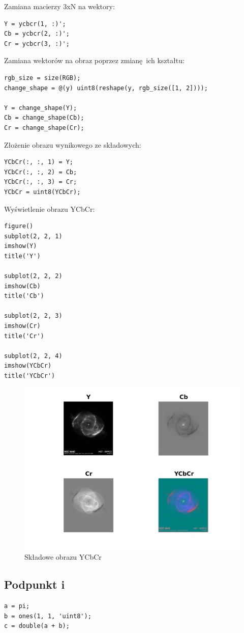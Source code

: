 \documentclass[a4paper, 12pt, titlepage]{article}
\begin{document}
       Zamiana macierzy 3xN na wektory:
\begin{lstlisting}
Y = ycbcr(1, :)';
Cb = ycbcr(2, :)';
Cr = ycbcr(3, :)';
\end{lstlisting}
       Zamiana wektorów na obraz poprzez zmianę ich kształtu:
\begin{lstlisting}
rgb_size = size(RGB);
change_shape = @(y) uint8(reshape(y, rgb_size([1, 2])));

Y = change_shape(Y);
Cb = change_shape(Cb);
Cr = change_shape(Cr);

\end{lstlisting}
       Złożenie obrazu wynikowego ze składowych:
\begin{lstlisting}
YCbCr(:, :, 1) = Y;
YCbCr(:, :, 2) = Cb;
YCbCr(:, :, 3) = Cr;
YCbCr = uint8(YCbCr);
\end{lstlisting}
        Wyświetlenie obrazu YCbCr:
\begin{lstlisting}
figure()
subplot(2, 2, 1)
imshow(Y)
title('Y')

subplot(2, 2, 2)
imshow(Cb)
title('Cb')

subplot(2, 2, 3)
imshow(Cr)
title('Cr')

subplot(2, 2, 4)
imshow(YCbCr)
title('YCbCr')
\end{lstlisting}
        \begin{figure}[H] \centering
            \includegraphics[width=0.8\columnwidth]{YCbCr.png}
            \caption{Składowe obrazu YCbCr}
        \end{figure}\noindent
        \subsection{Podpunkt i}
\begin{lstlisting}
a = pi;
b = ones(1, 1, 'uint8');
c = double(a + b);
\end{lstlisting}
\end{document}
